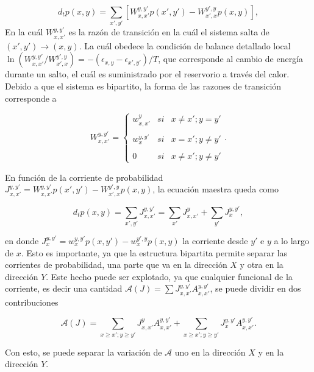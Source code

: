 \begin{equation*}
    d_{t}p(x,y) = \sum_{x',y'} \left[ W_{x,x'}^{y,y'}p(x',y')  - W_{x',x}^{y',y}p(x,y) \right],
\end{equation*}
En la cuál $W_{x,x'}^{y,y'}$ es la razón de transición en la cuál el sistema salta de $(x',y') \to (x,y)$. La cuál obedece la condición de balance detallado local $\ln (W_{x,x'}^{y,y'}/W_{x',x}^{y',y}) = - (\epsilon_{x,y} - \epsilon_{x',y'})/T$, que corresponde al cambio de energía durante un salto, el cuál es suministrado por el reservorio a través del calor. Debido a que el sistema es bipartito, la forma de las razones de transición corresponde a

\begin{equation*}
    W_{x,x'}^{y,y'} = \left\{ \begin{array}{lcc} w_{x,x'}^{y} & si & x \neq x'; y=y' \\ \\ w_{x}^{y,y'} & si & x=x';y\neq y'\\ \\ 0 & si & x \neq x'; y \neq y' \end{array} \right..
\end{equation*}

En función de la corriente de probabilidad $J_{x,x'}^{y,y'} = W_{x,x'}^{y,y'}p(x',y') - W_{x',x}^{y',y}p(x,y)$, la ecuación maestra queda como 

\begin{equation*}
    d_{t}p(x,y) = \sum_{x',y'}J_{x,x'}^{y,y'} = \sum_{x'}J_{x,x'}^{y} + \sum_{y'}J_{x}^{y,y'},
\end{equation*}

en donde $J_{x}^{y,y'} = w_{x}^{y,y'}p(x,y') - w_{x}^{y',y}p(x,y)$ la corriente desde $y'$ e $y$ a lo largo de $x$. Esto es importante, ya que la estructura bipartita permite separar las corrientes de probabilidad, una parte que va en la dirección $X$ y otra en la dirección $Y$. Este hecho puede ser explotado, ya que cualquier funcional de la corriente, es decir una cantidad $\mathcal{A}(J) = \sum J_{x,x'}^{y,y'}A_{x,x'}^{y,y'}$, se puede dividir en dos contribuciones\cite{horowitz2014thermodynamics}

\begin{equation}
    \mathcal{A}(J) = \sum_{x\geq x';y \geq y'} J_{x,x'}^{y}A_{x,x'}^{y,y'} + \sum_{x \geq x'; y \geq y'}J_{x}^{y,y'} A_{x,x'}^{y,y'}.
\label{sec4:functionalcurrent}
\end{equation}

Con esto, se puede separar la variación de $\mathcal{A}$ uno en la dirección $X$ y en la dirección $Y$. 

